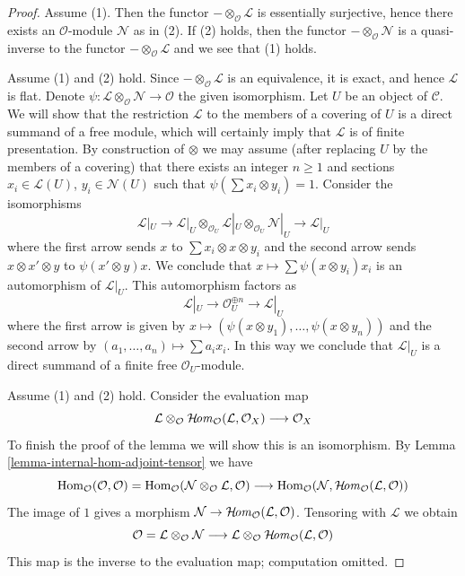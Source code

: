 \begin{proof}
Assume (1). Then the functor $- \otimes_\mathcal{O} \mathcal{L}$
is essentially surjective, hence there exists an $\mathcal{O}$-module
$\mathcal{N}$ as in (2). If (2) holds, then the functor
$- \otimes_\mathcal{O} \mathcal{N}$ is a quasi-inverse
to the functor $- \otimes_\mathcal{O} \mathcal{L}$ and
we see that (1) holds.

\medskip\noindent
Assume (1) and (2) hold. Since $- \otimes_\mathcal{O} \mathcal{L}$ is an
equivalence, it is exact, and hence $\mathcal{L}$ is flat. Denote
$\psi : \mathcal{L} \otimes_\mathcal{O} \mathcal{N} \to \mathcal{O}$
the given isomorphism. Let $U$ be an object of $\mathcal{C}$.
We will show that the restriction $\mathcal{L}$ to the members
of a covering of $U$ is a direct summand of a free module, which will
certainly imply that $\mathcal{L}$ is of finite presentation.
By construction of $\otimes$ we may assume (after replacing
$U$ by the members of a covering) that there exists
an integer $n \geq 1$ and sections $x_i \in \mathcal{L}(U)$,
$y_i \in \mathcal{N}(U)$ such that $\psi(\sum x_i \otimes y_i) = 1$.
Consider the isomorphisms
$$
\mathcal{L}|_U \to
\mathcal{L}|_U \otimes_{\mathcal{O}_U}
\mathcal{L}|_U \otimes_{\mathcal{O}_U} \mathcal{N}|_U \to \mathcal{L}|_U
$$
where the first arrow sends $x$ to $\sum x_i \otimes x \otimes y_i$
and the second arrow sends $x \otimes x' \otimes y$ to $\psi(x' \otimes y)x$.
We conclude that $x \mapsto \sum \psi(x \otimes y_i)x_i$ is
an automorphism of $\mathcal{L}|_U$. This automorphism factors as
$$
\mathcal{L}|_U \to \mathcal{O}_U^{\oplus n} \to \mathcal{L}|_U
$$
where the first arrow is given by
$x \mapsto (\psi(x \otimes y_1), \ldots, \psi(x \otimes y_n))$
and the second arrow by $(a_1, \ldots, a_n) \mapsto \sum a_i x_i$.
In this way we conclude that $\mathcal{L}|_U$ is a direct summand
of a finite free $\mathcal{O}_U$-module.

\medskip\noindent
Assume (1) and (2) hold. Consider the evaluation map
$$
\mathcal{L} \otimes_\mathcal{O}
\mathop{\mathcal{H}\!\mathit{om}}\nolimits_\mathcal{O}(\mathcal{L}, \mathcal{O}_X)
\longrightarrow \mathcal{O}_X
$$
To finish the proof of the lemma we will show this is an isomorphism.
By Lemma \ref{lemma-internal-hom-adjoint-tensor} we have
$$
\mathop{\mathrm{Hom}}\nolimits_\mathcal{O}(\mathcal{O}, \mathcal{O}) =
\mathop{\mathrm{Hom}}\nolimits_\mathcal{O}
(\mathcal{N} \otimes_\mathcal{O} \mathcal{L}, \mathcal{O})
\longrightarrow
\mathop{\mathrm{Hom}}\nolimits_\mathcal{O}
(\mathcal{N}, \mathop{\mathcal{H}\!\mathit{om}}\nolimits_\mathcal{O}(\mathcal{L}, \mathcal{O}))
$$
The image of $1$ gives a morphism
$\mathcal{N} \to \mathop{\mathcal{H}\!\mathit{om}}\nolimits_\mathcal{O}(\mathcal{L}, \mathcal{O})$.
Tensoring with $\mathcal{L}$ we obtain
$$
\mathcal{O} = \mathcal{L} \otimes_\mathcal{O} \mathcal{N}
\longrightarrow
\mathcal{L} \otimes_\mathcal{O} \mathop{\mathcal{H}\!\mathit{om}}\nolimits_\mathcal{O}(\mathcal{L}, \mathcal{O})
$$
This map is the inverse to the evaluation map; computation omitted.
\end{proof}

